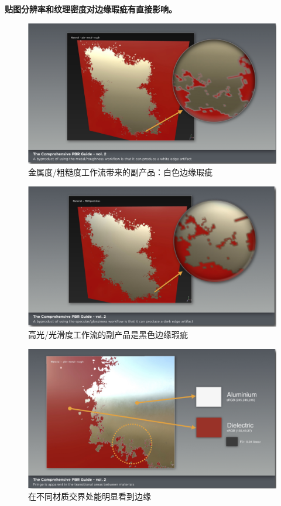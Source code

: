 \textbf{贴图分辨率和纹理密度对边缘瑕疵有直接影响。}

\begin{figure}[ht]
    \centering
	\includegraphics[width=\textwidth]{images/chap2_17.png}
	\caption{金属度/粗糙度工作流带来的副产品：白色边缘瑕疵}
    \label{fig:chap2_17}
\end{figure}

\begin{figure}[ht]
    \centering
	\includegraphics[width=\textwidth]{images/chap2_18.png}
	\caption{高光/光滑度工作流的副产品是黑色边缘瑕疵}
    \label{fig:chap2_18}
\end{figure}

\begin{figure}[ht]
    \centering
	\includegraphics[width=\textwidth]{images/chap2_19.png}
	\caption{在不同材质交界处能明显看到边缘}
    \label{fig:chap2_19}
\end{figure}

